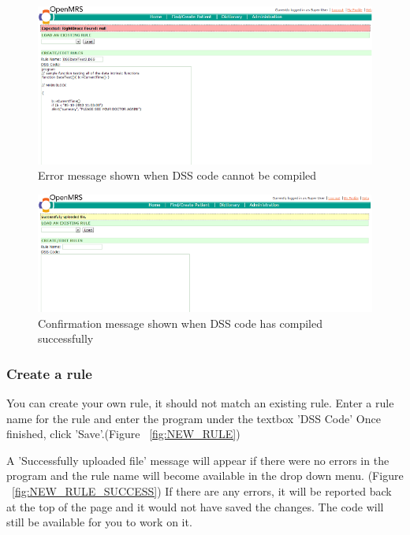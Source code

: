 \documentclass[12pt,letterpaper]{article}
\begin{document}
\begin{figure}\begin{center}
\includegraphics[width=6.5in]{user_guide/modify_error.png}
\end{center}
\caption{Error message shown when DSS code cannot be compiled}
\label{fig:MODIFY_ERROR}
\end{figure}

\begin{figure}\begin{center}
\includegraphics[width=6.5in]{user_guide/modify_success.png}
\end{center}
\caption{Confirmation message shown when DSS code has compiled successfully}
\label{fig:MODIFY_SUCCESS}
\end{figure}

\subsubsection{Create a rule}
You can create your own rule, it should not match an existing rule. Enter a rule name for the rule and enter the program under the textbox 'DSS Code' Once finished, click 'Save'.(Figure ~\ref{fig:NEW_RULE})

A 'Successfully uploaded file' message will appear if there were no errors in the program and the rule name will become available in the drop down menu. 
(Figure ~\ref{fig:NEW_RULE_SUCCESS})
If there are any errors, it will be reported back at the top of the page and it would not have saved the changes. The code will still be available for you to work on it.
\end{document}

